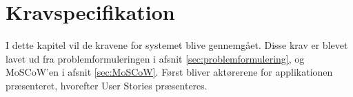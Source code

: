 \chapter{Kravspecifikation} \label{cph:kravspec}

I dette kapitel vil de kravene for systemet blive gennemgået. Disse krav er blevet lavet ud fra problemformuleringen i afsnit \ref{sec:problemformulering}, og MoSCoW'en i afsnit \ref{sec:MoSCoW}. Først bliver aktørerene for applikationen præsenteret, hvorefter User Stories præsenteres.




